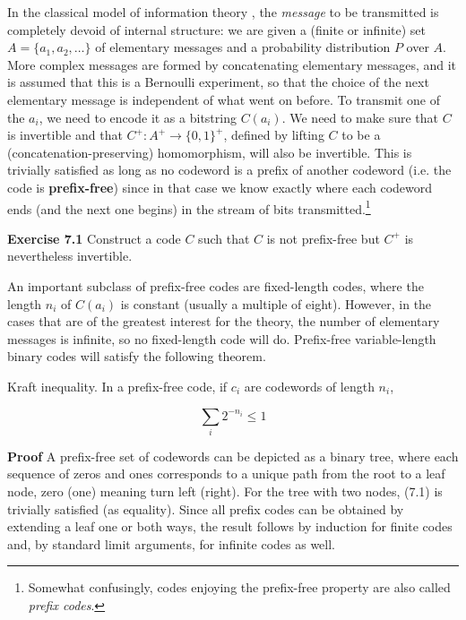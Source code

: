 In the classical model of information theory \cite{Shannon:1948}, the {\it
  message} to be transmitted is completely devoid of internal structure: we
are given a (finite or infinite) set $A = \{a_1,a_2,\ldots\}$ of elementary
messages and a probability distribution $P$ over $A$.  More complex messages
are formed by concatenating elementary messages, and it is assumed that this
is a Bernoulli experiment, so that the choice of the next elementary message
is independent of what went on before. To transmit one of the $a_i$, we need
to encode it as a bitstring $C(a_i)$. We need to make sure that $C$ is
invertible and that $C^+: A^+ \rightarrow \{0,1\}^+$, defined by lifting $C$
to be a (concatenation-preserving) homomorphism, will also be invertible. This
is trivially satisfied as long as no codeword is a prefix of another codeword
(i.e.  the code is {\bf prefix-free}) since in that case we know exactly
where each codeword ends (and the next one begins) in the stream of bits
transmitted.\footnote{Somewhat confusingly, codes enjoying the prefix-free
  property are also called {\it prefix codes}.}

\smallskip\noindent
{\bf Exercise 7.1} Construct a code $C$ such that $C$ is not prefix-free
but $C^+$ is nevertheless invertible. 

\smallskip\noindent An important subclass of prefix-free codes are
fixed-length codes, where the length $n_i$ of $C(a_i)$ is constant (usually a
multiple of eight).  However, in the cases that are of the greatest interest
for the theory, the number of elementary messages is infinite, so no
fixed-length code will do. Prefix-free variable-length binary codes will
satisfy the following theorem.

\smallskip{} Kraft inequality. In a prefix-free
code, if $c_i$ are codewords of length $n_i$,

\begin{equation}
\sum_i 2^{-n_i} \leq 1
\end{equation}

\smallskip\noindent
{\bf Proof} A prefix-free set of codewords can be depicted as a binary tree,
where each sequence of zeros and ones corresponds to a unique path from the
root to a leaf node, zero (one) meaning turn left (right). For the tree with
two nodes, (7.1) is trivially satisfied (as equality). Since all prefix codes
can be obtained by extending a leaf one or both ways, the result follows by
induction for finite codes and, by standard limit arguments, for infinite
codes as well.%

